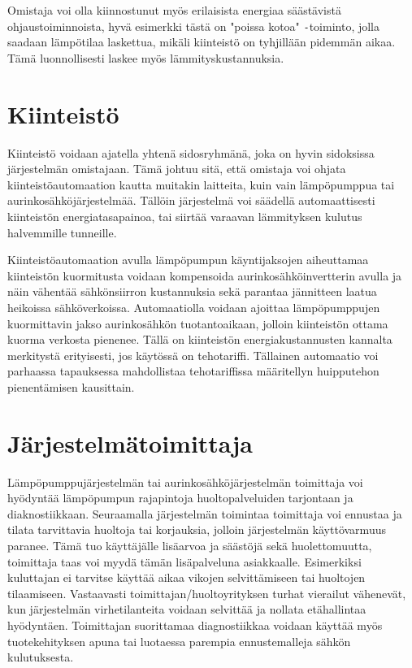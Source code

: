   Omistaja voi olla kiinnostunut myös erilaisista energiaa säästävistä ohjaustoiminnoista, hyvä esimerkki tästä on "poissa kotoa"{} \texttt{-}toiminto, jolla saadaan lämpötilaa laskettua, mikäli kiinteistö on tyhjillään pidemmän aikaa. Tämä luonnollisesti laskee myös lämmityskustannuksia.

\section{Kiinteistö}
  Kiinteistö voidaan ajatella yhtenä sidosryhmänä, joka on hyvin sidoksissa järjestelmän omistajaan.  Tämä johtuu sitä, että omistaja voi ohjata kiinteistöautomaation kautta muitakin laitteita, kuin vain lämpöpumppua tai aurinkosähköjärjestelmää. Tällöin järjestelmä voi säädellä automaattisesti kiinteistön energiatasapainoa, tai siirtää varaavan lämmityksen kulutus halvemmille tunneille.

  Kiinteistöautomaation avulla lämpöpumpun käyntijaksojen aiheuttamaa kiinteistön kuormitusta voidaan kompensoida aurinkosähköinvertterin avulla ja näin vähentää sähkönsiirron kustannuksia sekä parantaa jännitteen laatua heikoissa sähköverkoissa. Automaatiolla voidaan ajoittaa lämpöpumppujen kuormittavin jakso aurinkosähkön tuotantoaikaan, jolloin kiinteistön ottama kuorma verkosta pienenee. Tällä on kiinteistön energiakustannusten kannalta merkitystä erityisesti, jos käytössä on tehotariffi. Tällainen automaatio voi parhaassa tapauksessa mahdollistaa tehotariffissa määritellyn huipputehon pienentämisen kausittain.


\section{Järjestelmätoimittaja}

  Lämpöpumppujärjestelmän tai aurinkosähköjärjestelmän toimittaja voi hyödyntää lämpöpumpun rajapintoja huoltopalveluiden tarjontaan ja diaknostiikkaan. Seuraamalla järjestelmän toimintaa toimittaja voi ennustaa ja tilata tarvittavia huoltoja tai korjauksia, jolloin järjestelmän käyttövarmuus paranee. Tämä tuo käyttäjälle lisäarvoa ja säästöjä sekä huolettomuutta, toimittaja taas voi myydä tämän lisäpalveluna asiakkaalle. Esimerkiksi kuluttajan ei tarvitse käyttää aikaa vikojen selvittämiseen tai huoltojen tilaamiseen. Vastaavasti toimittajan/huoltoyrityksen turhat vierailut vähenevät, kun järjestelmän virhetilanteita voidaan selvittää ja nollata etähallintaa hyödyntäen. Toimittajan suorittamaa diagnostiikkaa voidaan käyttää myös tuotekehityksen apuna tai luotaessa parempia ennustemalleja sähkön kulutuksesta.

